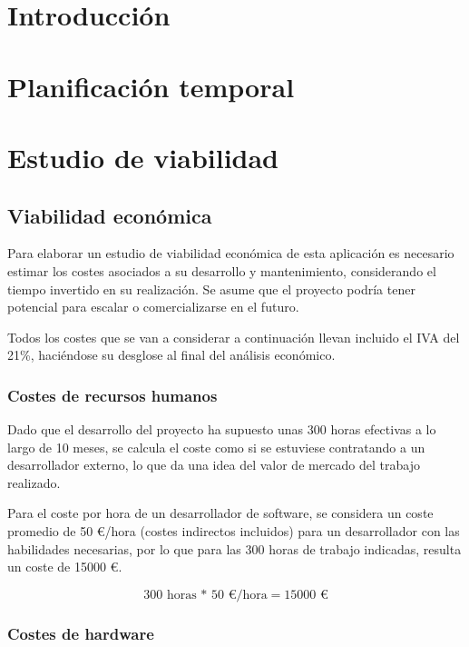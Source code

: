 
\section{Introducción}

\section{Planificación temporal}

\section{Estudio de viabilidad}

\subsection{Viabilidad económica}

Para elaborar un estudio de viabilidad económica de esta aplicación es necesario estimar los costes asociados a su desarrollo y mantenimiento, considerando el tiempo invertido en su realización. Se asume que el proyecto podría tener potencial para escalar o comercializarse en el futuro.

Todos los costes que se van a considerar a continuación llevan incluido el IVA del 21\%, haciéndose su desglose al final del análisis económico.

\subsubsection{Costes de recursos humanos}

Dado que el desarrollo del proyecto ha supuesto unas 300 horas efectivas a lo largo de 10 meses, se calcula el coste como si se estuviese contratando a un desarrollador externo, lo que da una idea del valor de mercado del trabajo realizado.

Para el coste por hora de un desarrollador de software, se considera un coste promedio de 50 €/hora (costes indirectos incluidos) para un desarrollador con las habilidades necesarias, por lo que para las 300 horas de trabajo indicadas, resulta un coste de \num{15000} €.

\[ 300 \text{ horas * } 50\text{ €/hora} = \num{15000}\text{ €}
 \]
 
 \subsubsection{Costes de hardware}
 

